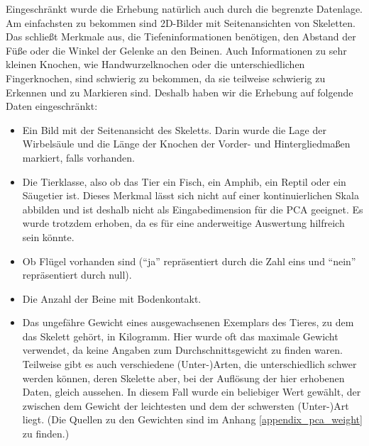  Eingeschränkt wurde die Erhebung natürlich auch durch die begrenzte Datenlage. Am einfachsten zu bekommen sind 2D-Bilder mit Seitenansichten von Skeletten. Das schließt Merkmale aus, die Tiefeninformationen benötigen, \zb den Abstand der Füße oder die Winkel der Gelenke an den Beinen. Auch Informationen zu sehr kleinen Knochen, wie Handwurzelknochen oder die unterschiedlichen Fingerknochen, sind schwierig zu bekommen, da sie teilweise schwierig zu Erkennen und zu Markieren sind. 
 Deshalb haben wir die Erhebung auf folgende Daten eingeschränkt:
  
 \begin{itemize}
  \item Ein Bild mit der Seitenansicht des Skeletts.
  Darin wurde die Lage der Wirbelsäule und die Länge der Knochen der Vorder- und Hintergliedmaßen markiert, falls vorhanden.
  
  \item Die Tierklasse, also ob das Tier ein Fisch, ein Amphib, ein Reptil oder ein Säugetier ist. Dieses Merkmal lässt sich nicht auf einer kontinuierlichen Skala abbilden und ist deshalb nicht als Eingabedimension für die PCA geeignet. Es wurde trotzdem erhoben, da es für eine anderweitige Auswertung hilfreich sein könnte.
  
  \item Ob Flügel vorhanden sind ("`ja"' repräsentiert durch die Zahl eins und "`nein"' repräsentiert durch null).
  
  \item Die Anzahl der Beine mit Bodenkontakt.
  
  \item Das ungefähre Gewicht eines ausgewachsenen Exemplars des Tieres, zu dem das Skelett gehört, in Kilogramm. Hier wurde oft das maximale Gewicht verwendet, da keine Angaben zum Durchschnittsgewicht zu finden waren. Teilweise gibt es auch verschiedene (Unter-)Arten, die unterschiedlich schwer werden können, deren Skelette aber, bei der Auflösung der hier erhobenen Daten, gleich aussehen. In diesem Fall wurde ein beliebiger Wert gewählt, der zwischen dem Gewicht der leichtesten und dem der schwersten (Unter-)Art liegt. (Die Quellen zu den Gewichten sind im Anhang \ref{appendix_pca_weight} zu finden.)
 \end{itemize}

